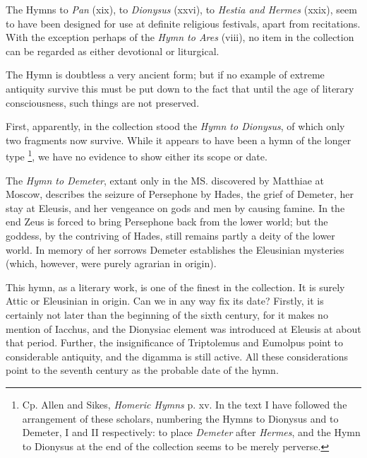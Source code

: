 The Hymns to \emph{Pan} (xix), to \emph{Dionysus} (xxvi), to \emph{Hestia and
Hermes} (xxix), seem to have been designed for use at definite religious
festivals, apart from recitations. With the exception perhaps of the \emph{Hymn to
Ares} (viii), no item in the collection can be regarded as either devotional
or liturgical.

The Hymn is doubtless a very ancient form; but if no example of extreme
antiquity survive this must be put down to the fact that until the age of
literary consciousness, such things are not preserved.

First, apparently, in the collection stood the \emph{Hymn to Dionysus}, of
which only two fragments now survive. While it appears to have been a hymn of
the longer type \footnote{Cp. Allen and Sikes,
\emph{Homeric Hymns} p. xv. In the text I have followed the arrangement of
these scholars, numbering the Hymns to Dionysus and to Demeter, I and II
respectively: to place \emph{Demeter} after \emph{Hermes}, and the Hymn to
Dionysus at the end of the collection seems to be merely perverse.}, we have no evidence to show
either its scope or date.

The \emph{Hymn to Demeter}, extant only in the MS. discovered by Matthiae at
Moscow, describes the seizure of Persephone by Hades, the grief of Demeter, her
stay at Eleusis, and her vengeance on gods and men by causing famine. In the
end Zeus is forced to bring Persephone back from the lower world; but the
goddess, by the contriving of Hades, still remains partly a deity of the lower
world. In memory of her sorrows Demeter establishes the Eleusinian mysteries
(which, however, were purely agrarian in origin).

This hymn, as a literary work, is one of the finest in the collection. It is
surely Attic or Eleusinian in origin. Can we in any way fix its date? Firstly,
it is certainly not later than the beginning of the sixth century, for it makes
no mention of Iacchus, and the Dionysiac element was introduced at Eleusis at
about that period. Further, the insignificance of Triptolemus and Eumolpus
point to considerable antiquity, and the digamma is still active. All these
considerations point to the seventh century as the probable date of the hymn.

